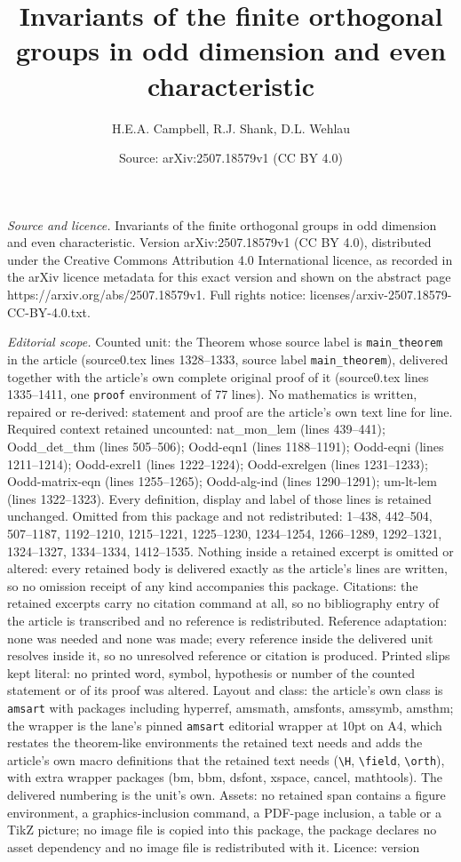 \documentclass[10pt,a4paper]{amsart}
\title[Invariants of the finite orthogonal groups in odd dimension ]{Invariants of the finite orthogonal groups in odd dimension and even characteristic}
\author{H.E.A. Campbell, R.J. Shank, D.L. Wehlau}
\date{Source: arXiv:2507.18579v1 (CC BY 4.0)}
\begin{document}
\maketitle

\noindent\emph{Source and licence.} Invariants of the finite orthogonal groups in odd dimension and even characteristic. Version arXiv:2507.18579v1 (CC BY 4.0), distributed under the Creative Commons Attribution 4.0 International licence, as recorded in the arXiv licence metadata for this exact version and shown on the abstract page https://arxiv.org/abs/2507.18579v1. Full rights notice: licenses/arxiv-2507.18579-CC-BY-4.0.txt.\par\smallskip

\noindent\textit{Editorial scope.} Counted unit: the Theorem whose source label is \texttt{main\_theorem} in the article (source0.tex lines 1328--1333, source label \texttt{main\_theorem}), delivered together with the article's own complete original proof of it (source0.tex lines 1335--1411, one \texttt{proof} environment of 77 lines). No mathematics is written, repaired or re-derived: statement and proof are the article's own text line for line. Required context retained uncounted: nat\_mon\_lem (lines 439--441); Oodd\_det\_thm (lines 505--506); Oodd-eqn1 (lines 1188--1191); Oodd-eqni (lines 1211--1214); Oodd-exrel1 (lines 1222--1224); Oodd-exrelgen (lines 1231--1233); Oodd-matrix-eqn (lines 1255--1265); Oodd-alg-ind (lines 1290--1291); um-lt-lem (lines 1322--1323). Every definition, display and label of those lines is retained unchanged. Omitted from this package and not redistributed: 1--438, 442--504, 507--1187, 1192--1210, 1215--1221, 1225--1230, 1234--1254, 1266--1289, 1292--1321, 1324--1327, 1334--1334, 1412--1535. Nothing inside a retained excerpt is omitted or altered: every retained body is delivered exactly as the article's lines are written, so no omission receipt of any kind accompanies this package. Citations: the retained excerpts carry no citation command at all, so no bibliography entry of the article is transcribed and no reference is redistributed. Reference adaptation: none was needed and none was made; every reference inside the delivered unit resolves inside it, so no unresolved reference or citation is produced. Printed slips kept literal: no printed word, symbol, hypothesis or number of the counted statement or of its proof was altered. Layout and class: the article's own class is \texttt{amsart} with packages including hyperref, amsmath, amsfonts, amssymb, amsthm; the wrapper is the lane's pinned \texttt{amsart} editorial wrapper at 10pt on A4, which restates the theorem-like environments the retained text needs and adds the article's own macro definitions that the retained text needs (\texttt{\textbackslash H}, \texttt{\textbackslash field}, \texttt{\textbackslash orth}), with extra wrapper packages (bm, bbm, dsfont, xspace, cancel, mathtools). The delivered numbering is the unit's own. Assets: no retained span contains a figure environment, a graphics-inclusion command, a PDF-page inclusion, a table or a TikZ picture; no image file is copied into this package, the package declares no asset dependency and no image file is redistributed with it. Licence: version 
\end{document}
